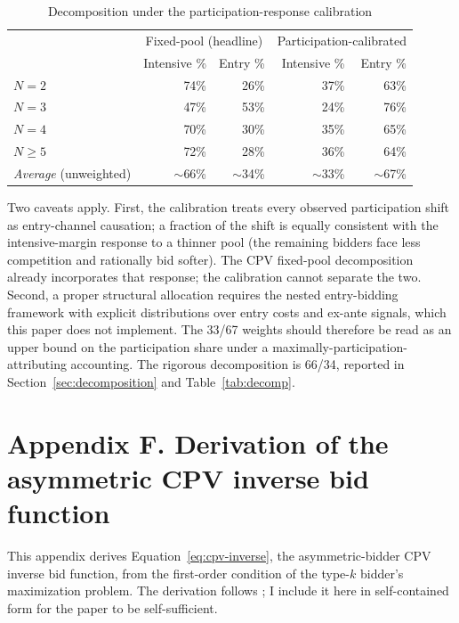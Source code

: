 \documentclass[12pt]{article}
\begin{document}
\begin{table}[htbp]
\centering
\caption{Decomposition under the participation-response calibration}
\label{tab:decomp-endogenous}
\small
\begin{tabular}{lrrrr}
\toprule
         & \multicolumn{2}{c}{Fixed-pool (headline)} &
           \multicolumn{2}{c}{Participation-calibrated} \\
         & Intensive \% & Entry \% & Intensive \% & Entry \% \\
\midrule
$N = 2$   & 74\% & 26\% & 37\% & 63\% \\
$N = 3$   & 47\% & 53\% & 24\% & 76\% \\
$N = 4$   & 70\% & 30\% & 35\% & 65\% \\
$N \geq 5$& 72\% & 28\% & 36\% & 64\% \\
\midrule
\textit{Average} (unweighted) & $\sim$66\% & $\sim$34\% & $\sim$33\% & $\sim$67\% \\
\bottomrule
\end{tabular}
\end{table}

Two caveats apply. First, the calibration treats every observed
participation shift as entry-channel causation; a fraction of the
shift is equally consistent with the intensive-margin response to
a thinner pool (the remaining bidders face less competition and
rationally bid softer). The CPV fixed-pool decomposition already
incorporates that response; the calibration cannot separate the
two. Second, a proper structural allocation requires the
\citet{atheyseira2011} nested entry-bidding framework with
explicit distributions over entry costs and ex-ante signals,
which this paper does not implement. The 33/67 weights should
therefore be read as an upper bound on the participation share
under a maximally-participation-attributing accounting. The
rigorous decomposition is 66/34, reported in
Section~\ref{sec:decomposition} and Table~\ref{tab:decomp}.

\section*{Appendix F. Derivation of the asymmetric CPV inverse bid function}
\label{app:cpv-derivation}

This appendix derives Equation~\eqref{eq:cpv-inverse}, the
asymmetric-bidder CPV inverse bid function, from the first-order
condition of the type-$k$ bidder's maximization problem. The
derivation follows \citet{campo2003}; I include it here in
self-contained form for the paper to be self-sufficient.
\end{document}
